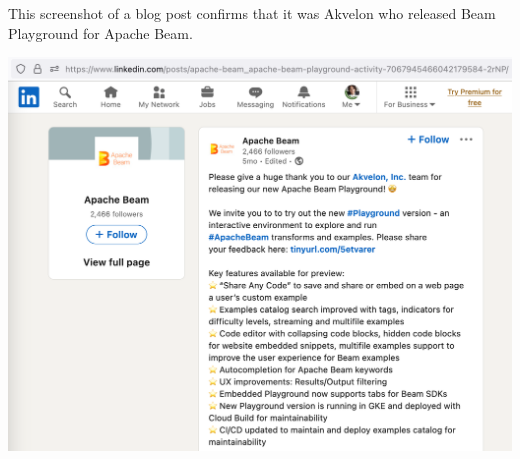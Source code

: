 
This screenshot of a blog post confirms that it was Akvelon
who released Beam Playground for Apache Beam.

\includegraphics[width=\textwidth]{beam-akvelon-announcement}

\pagebreak
